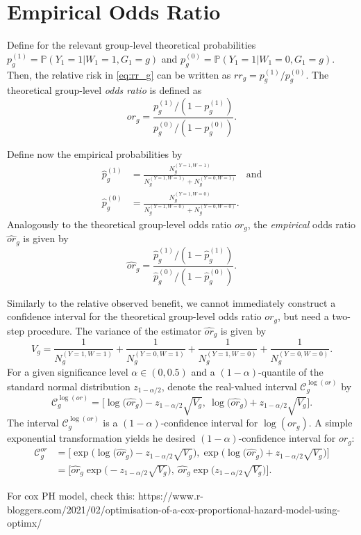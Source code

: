 \documentclass{article}
\begin{document}
\section{Empirical Odds Ratio}
Define for the relevant group-level theoretical probabilities $p_g^{(1)} = \mathbb{P}(Y_1 = 1 | W_1 = 1, G_1 = g)$ and $p_g^{(0)} = \mathbb{P}(Y_1 = 1 | W_1 = 0, G_1 = g)$. Then, the relative risk in \eqref{eq:rr_g} can be written as $rr_g = p_g^{(1)} / p_g^{(0)}$. The theoretical group-level \textit{odds ratio} is defined as
\begin{equation}
    or_g = \frac{p_g^{(1)} / (1 - p_g^{(1)})}{p_g^{(0)} / (1 - p_g^{(0)})}.
\end{equation}

Define now the empirical probabilities by 
\begin{align*}
\hat{p}_g^{(1)} &= \frac{N_g^{(Y=1,W=1)}}{N_g^{(Y=1,W=1)} + N_g^{(Y=0,W=1)}} \quad \text{and}
\\
\hat{p}_g^{(0)} &= \frac{N_g^{(Y=1,W=0)}}{N_g^{(Y=1,W=0)} + N_g^{(Y=0,W=0)}}.
\end{align*}
Analogously to the theoretical group-level odds ratio $or_g$, the \textit{empirical} odds ratio $\widehat{or}_g$ is given by
\begin{equation}
    \widehat{or}_g = \frac{\hat{p}_g^{(1)} / (1 - \hat{p}_g^{(1)})}{\hat{p}_g^{(0)} / (1 - \hat{p}_g^{(0)})}.
\end{equation}

Similarly to the relative observed benefit, we cannot immediately construct a confidence interval for the theoretical group-level odds ratio $or_g$, but need a two-step procedure.
The variance of the estimator $\widehat{or}_g$ is given by
\begin{equation}
    V_g = \frac{1}{N_g^{(Y=1, W=1)}} + 
    \frac{1}{N_g^{(Y=0, W=1)}} +
    \frac{1}{N_g^{(Y=1, W=0)}} + 
    \frac{1}{N_g^{(Y=0, W=0)}}.
\end{equation}
For a given significance level $\alpha \in (0,0.5)$ and a $(1-\alpha)$-quantile of the standard normal distribution $z_{1-\alpha / 2}$, denote the real-valued interval $\mathcal{C}_g^{\log (or)}$ by
\begin{equation}
    \mathcal{C}^{\log(or)}_g
    =
    \Big[
    \log \big( \widehat{or}_g\big) - z_{1-\alpha / 2} \sqrt{V_g},\ 
    \log \big( \widehat{or}_g\big) + z_{1-\alpha / 2} \sqrt{V_g}
    \Big].
\end{equation}
The interval $\mathcal{C}_g^{\log (or)}$ is a $(1-\alpha)$-confidence interval for $\log(or_g)$. A simple exponential transformation yields he desired $(1-\alpha)$-confidence interval for $or_g$:
\begin{equation}
\begin{split}
    \mathcal{C}_g^{or}
    &=
    \Bigg[ 
    \exp\Big( \log \big( \widehat{or}_g\big) - z_{1-\alpha / 2} \sqrt{V_g} \Big),
    \exp\Big( \log \big( \widehat{or}_g\big) + z_{1-\alpha / 2} \sqrt{V_g} \Big)
    \Bigg]
    \\
    &=
   \Bigg[ 
   \widehat{or}_g 
   \exp \Big(
   - z_{1-\alpha / 2} \sqrt{V_g} \Big),\ 
   \widehat{or}_g 
   \exp \Big(
    z_{1-\alpha / 2} \sqrt{V_g} \Big)
    \Bigg].
\end{split}
\end{equation}

For cox PH model, check this: https://www.r-bloggers.com/2021/02/optimisation-of-a-cox-proportional-hazard-model-using-optimx/
\end{document}
